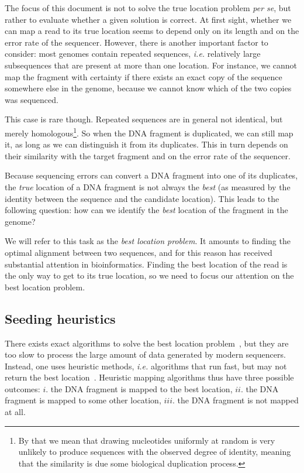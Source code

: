 \documentclass{article}
\begin{document}
The focus of this document is not to solve the true location problem
\textit{per se}, but rather to evaluate whether a given solution is
correct. At first sight, whether we can map a read to its true location
seems to depend only on its length and on the error rate of the
sequencer. However, there is another important factor to consider: most
genomes contain repeated sequences, \textit{i.e.} relatively large
subsequences that are present at more than one location. For instance, we
cannot map the fragment with certainty if there exists an exact copy of
the sequence somewhere else in the genome, because we cannot know which of
the two copies was sequenced.

This case is rare though. Repeated sequences are in general not identical,
but merely homologous\footnote{By that we mean that drawing nucleotides
uniformly at random is very unlikely to produce sequences with the
observed degree of identity, meaning that the similarity is due some
biological duplication process.}. So when the DNA fragment is duplicated,
we can still map it, as long as we can distinguish it from its duplicates.
This in turn depends on their similarity with the target fragment and on
the error rate of the sequencer.

Because sequencing errors can convert a DNA fragment into one of its
duplicates, the \emph{true} location of a DNA fragment is not always the
\emph{best} (as measured by the identity between the sequence and the
candidate location). This leads to the following question: how can we
identify the \emph{best} location of the fragment in the genome? 

We will refer to this task as the \emph{best location problem}. It amounts
to finding the optimal alignment between two sequences, and for this
reason has received substantial attention in bioinformatics. Finding the
best location of the read is the only way to get to its true location, so
we need to focus our attention on the best location problem.

\subsection{Seeding heuristics}
\label{sec:seedheur}

There exists exact algorithms to solve the best location
problem~\cite{pmid7265238,pmid5420325}, but they are too slow to process
the large amount of data generated by modern sequencers. Instead, one uses
heuristic methods, \textit{i.e.} algorithms that run fast, but may not
return the best location~\cite{Waterman1984}. Heuristic mapping algorithms
thus have three possible outcomes: $i.$ the DNA fragment is mapped to the
best location, $ii.$ the DNA fragment is mapped to some other location,
$iii.$ the DNA fragment is not mapped at all.
\end{document}
